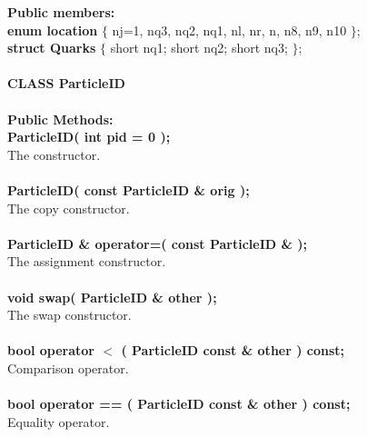 \begin{tabbing}
{\bf Public members:} \\
\hspace{0.5in}  {\bf enum location } 
       $\{$ nj=1, nq3, nq2, nq1, nl, nr, n, n8, n9, n10 $\}$; \\
\hspace{0.5in}  {\bf  struct Quarks } $\{$
    short nq1;
    short nq2;
    short nq3; $\}$; \\  \\

{\bf CLASS ParticleID } \\  \\

{\bf Public Methods:} \\
\hspace{0.5in}  {\bf ParticleID( int pid = 0 ); } \\
\hspace{0.5in}  The constructor.\\ \\
\hspace{0.5in}  {\bf ParticleID( const ParticleID \& orig ); } \\
\hspace{0.5in}  The copy constructor. \\ \\
\hspace{0.5in}  {\bf ParticleID \& operator=( const ParticleID \& ); } \\
\hspace{0.5in}  The assignment constructor. \\ \\
\hspace{0.5in}  {\bf void swap( ParticleID \& other ); } \\
\hspace{0.5in}  The swap constructor. \\ \\
\hspace{0.5in}  {\bf bool  operator $<$  ( ParticleID const \& other ) const;} \\
\hspace{0.5in}  Comparison operator. \\ \\
\hspace{0.5in}  {\bf bool  operator == ( ParticleID const \& other ) const;} \\
\hspace{0.5in}  Equality operator. \\ \\


\end{tabbing}
